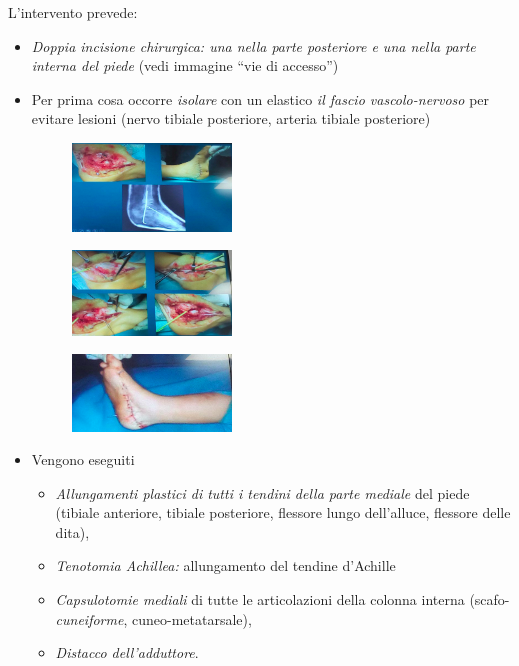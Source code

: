 \begin{itemize}
L'intervento prevede:

\begin{itemize}
\item
  \emph{Doppia incisione chirurgica: una nella parte posteriore e una nella parte interna del piede} (vedi immagine ``vie di accesso'')
\item
  Per prima cosa occorre \emph{isolare} con un elastico \emph{il fascio vascolo-nervoso} per evitare lesioni (nervo tibiale posteriore, arteria tibiale posteriore)

\begin{figure}[!ht]
\centering
\includegraphics[width=0.4\textwidth]{016/image29.png}
\end{figure}

\begin{figure}[!ht]
\centering
\includegraphics[width=0.4\textwidth]{016/image30.png}
\end{figure}

\begin{figure}[!ht]
\centering
\includegraphics[width=0.4\textwidth]{016/image31.png}
\end{figure}

\item
  Vengono eseguiti
  \begin{itemize}
    \item
    \emph{Allungamenti plastici di tutti i tendini della parte mediale} del piede (tibiale anteriore, tibiale posteriore, flessore lungo dell'alluce, flessore delle dita),
  \item
    \emph{\emph{Tenotomia Achillea:}} allungamento del tendine d'Achille
  \item
    \emph{Capsulotomie mediali} di tutte le articolazioni della colonna interna (scafo-\emph{cuneiforme}, cuneo-metatarsale),
  \item
    \emph{Distacco dell'adduttore}.
\end{itemize}
\end{itemize}


\end{itemize}
